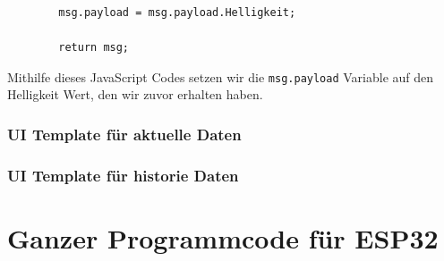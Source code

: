 \documentclass[9pt,a4paper]{report}
\begin{document}
	\begin{lstlisting}
		msg.payload = msg.payload.Helligkeit;
		
		return msg;
	\end{lstlisting}
	Mithilfe dieses JavaScript Codes setzen wir die \texttt{msg.payload} Variable auf den Helligkeit Wert, den wir zuvor erhalten haben.
	
	\subsection{UI Template für aktuelle Daten}
	
	
	\subsection{UI Template für historie Daten}
	
	
	
	\chapter{Ganzer Programmcode für ESP32}
	
	
\end{document}
